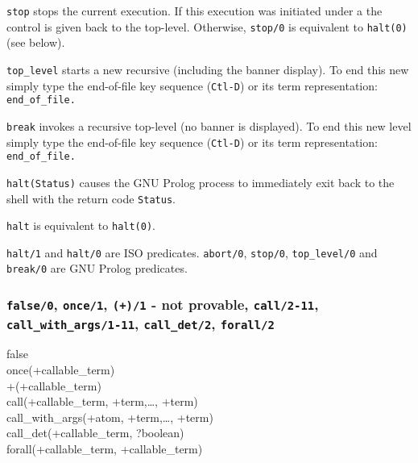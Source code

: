 \texttt{stop} stops the current execution. If this execution was initiated
under a  the control is given back to the
top-level. Otherwise, \texttt{stop/0} is equivalent to \texttt{halt(0)}
(see below).

\texttt{top\_level} starts a new recursive  (including the
banner display). To end this new  simply type the end-of-file
key sequence (\texttt{Ctl-D}) or its term representation:
\texttt{end\_of\_file.}

\texttt{break} invokes a recursive top-level (no banner is displayed). To
end this new level simply type the end-of-file key sequence (\texttt{Ctl-D})
or its term representation: \texttt{end\_of\_file.}

\texttt{halt(Status)} causes the GNU Prolog process to immediately exit back to
the shell with the return code \texttt{Status}.

\texttt{halt} is equivalent to \texttt{halt(0)}.

\begin{PlErrors}



\end{PlErrors}

\Portability

\texttt{halt/1} and \texttt{halt/0} are ISO predicates. \texttt{abort/0},
\texttt{stop/0}, \texttt{top\_level/0} and \texttt{break/0} are GNU Prolog
predicates.

\subsubsection{\texttt{false/0}, \texttt{once/1}, \texttt{({\bs}+)/1} - not provable,
               \texttt{call/2-11}, 
	       \texttt{call\_with\_args/1-11}, \texttt{call\_det/2}, \texttt{forall/2}}

\begin{TemplatesOneCol}
false\\
once(+callable\_term)\\
{\bs}+(+callable\_term) \\
call(+callable\_term, +term,\ldots, +term)\\
call\_with\_args(+atom, +term,\ldots, +term)\\
call\_det(+callable\_term, ?boolean) \\
forall(+callable\_term, +callable\_term)

\end{TemplatesOneCol}

